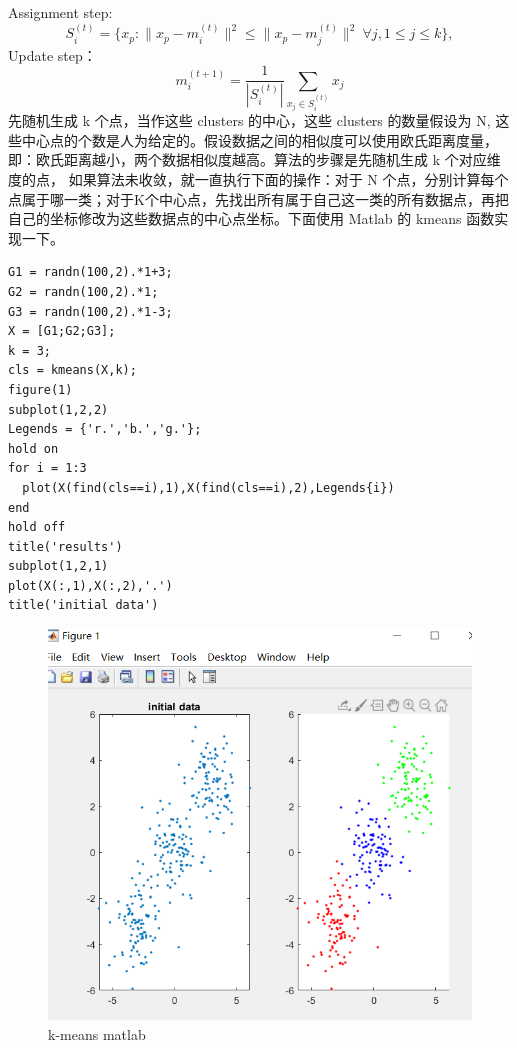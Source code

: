 \documentclass[UTF8]{ctexart}
\begin{document}
        Assignment step: \[ S_{i}^{(t)}={\big \{}x_{p}:{\big \|}x_{p}-m_{i}^{(t)}{\big \|}^{2}\leq {\big \|}x_{p}-m_{j}^{(t)}{\big \|}^{2}\ \forall j,1\leq j\leq k{\big \}}, \] \qquad Update step：\[ {\displaystyle m_{i}^{(t+1)}={\frac {1}{\left|S_{i}^{(t)}\right|}}\sum _{x_{j}\in S_{i}^{(t)}}x_{j}} \] 
        \qquad 先随机生成 k 个点，当作这些 clusters 的中心，这些 clusters 的数量假设为 N, 这些中心点的个数是人为给定的。假设数据之间的相似度可以使用欧氏距离度量，即：欧氏距离越小，两个数据相似度越高。算法的步骤是先随机生成 k 个对应维度的点，%
        如果算法未收敛，就一直执行下面的操作：对于 N 个点，分别计算每个点属于哪一类；对于K个中心点，先找出所有属于自己这一类的所有数据点，再把自己的坐标修改为这些数据点的中心点坐标。下面使用 Matlab 的 kmeans 函数实现一下。

\begin{lstlisting}[style=styleM]
G1 = randn(100,2).*1+3;
G2 = randn(100,2).*1;
G3 = randn(100,2).*1-3;
X = [G1;G2;G3];
k = 3;
cls = kmeans(X,k);
figure(1)
subplot(1,2,2)
Legends = {'r.','b.','g.'};
hold on
for i = 1:3
  plot(X(find(cls==i),1),X(find(cls==i),2),Legends{i})
end
hold off
title('results')
subplot(1,2,1)
plot(X(:,1),X(:,2),'.')
title('initial data')
\end{lstlisting}
\begin{figure}[ht]
\centering
\includegraphics[scale=0.8]{kmeans_m1.png}
\caption{k-means matlab}
\end{figure}
\end{document}
